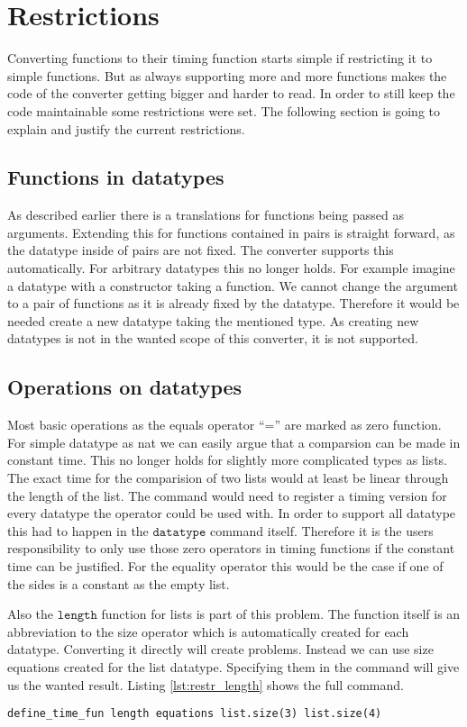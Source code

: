 
\section{Restrictions} \label{chapter:restrictions}
Converting functions to their timing function starts simple if restricting it to simple functions.
But as always supporting more and more functions makes the code of the converter getting bigger and harder to read.
In order to still keep the code maintainable some restrictions were set.
The following section is going to explain and justify the current restrictions.

\subsection{Functions in datatypes}
As described earlier there is a translations for functions being passed as arguments.
Extending this for functions contained in pairs is straight forward, as the datatype inside of pairs are not fixed.
The converter supports this automatically.
For arbitrary datatypes this no longer holds.
For example imagine a datatype with a constructor taking a function.
We cannot change the argument to a pair of functions as it is already fixed by the datatype.
Therefore it would be needed create a new datatype taking the mentioned type.
As creating new datatypes is not in the wanted scope of this converter, it is not supported.

\subsection{Operations on datatypes} \label{chapter:nonconstant_zeros}
Most basic operations as the equals operator ``='' are marked as zero function.
For simple datatype as nat we can easily argue that a comparsion can be made in constant time.
This no longer holds for slightly more complicated types as lists.
The exact time for the comparision of two lists would at least be linear through the length of the list.
The command would need to register a timing version for every datatype the operator could be used with.
In order to support all datatype this had to happen in the $\texttt{datatype}$ command itself.
Therefore it is the users responsibility to only use those zero operators in timing functions if the constant time can be justified.
For the equality operator this would be the case if one of the sides is a constant as the empty list.

Also the $\texttt{length}$ function for lists is part of this problem.
The function itself is an abbreviation to the size operator which is automatically created for each datatype.
Converting it directly will create problems.
Instead we can use size equations created for the list datatype.
Specifying them in the command will give us the wanted result.
Listing \ref{lst:restr_length} shows the full command.
\begin{lstlisting}[language=isabelle,float,label=lst:restr_length,caption=Converting the length function correctly]
  define_time_fun length equations list.size(3) list.size(4)
\end{lstlisting}

